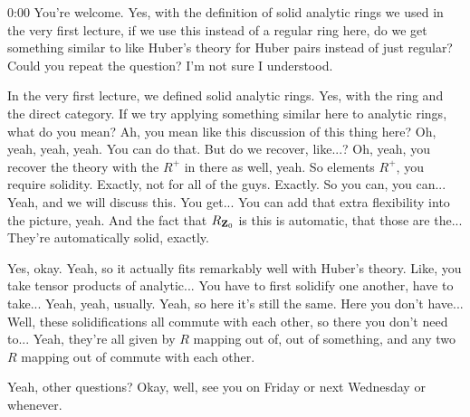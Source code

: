 \begin{unfinished}{0:00}
You're welcome. Yes, with the definition of solid analytic rings we used in the very first lecture, if we use this instead of a regular ring here, do we get something similar to like Huber's theory for Huber pairs instead of just regular? Could you repeat the question? I'm not sure I understood.

In the very first lecture, we defined solid analytic rings. Yes, with the ring and the direct category. If we try applying something similar here to analytic rings, what do you mean? Ah, you mean like this discussion of this thing here? Oh, yeah, yeah, yeah. You can do that. But do we recover, like...? Oh, yeah, you recover the theory with the $R^+$ in there as well, yeah. So elements $R^+$, you require solidity. Exactly, not for all of the guys. Exactly. So you can, you can... Yeah, and we will discuss this. You get... You can add that extra flexibility into the picture, yeah. And the fact that $R_{\mathbf Z_0}$ is this is automatic, that those are the... They're automatically solid, exactly.

Yes, okay. Yeah, so it actually fits remarkably well with Huber's theory. Like, you take tensor products of analytic... You have to first solidify one another, have to take... Yeah, yeah, usually. Yeah, so here it's still the same. Here you don't have... Well, these solidifications all commute with each other, so there you don't need to... Yeah, they're all given by $R$ mapping out of, out of something, and any two $R$ mapping out of commute with each other.

Yeah, other questions? Okay, well, see you on Friday or next Wednesday or whenever.

\end{unfinished}
